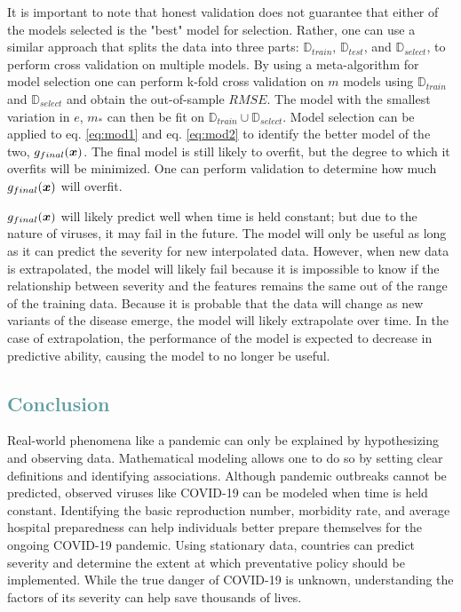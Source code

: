 \documentclass[12pt]{article}
\begin{document}
It is important to note that honest validation does not guarantee that either of the models selected is the "best" model for selection. Rather, one can use a similar approach that splits the data into three parts: $\mathbb{D}_{train}$, $\mathbb{D}_{test}$, and $\mathbb{D}_{select}$, to perform cross validation on multiple models. By using a meta-algorithm for model selection one can perform k-fold cross validation on $m$ models using $\mathbb{D}_{train}$ and $\mathbb{D}_{select}$ and obtain the out-of-sample $RMSE$. The model with the smallest variation in $e$, $m_*$ can then be fit on $\mathbb{D}_{train} \cup \mathbb{D}_{select}$. Model selection can be applied to eq. \ref{eq:mod1} and eq. \ref{eq:mod2} to identify the better model of the two, $g_{final}(\boldsymbol{x})$. The final model is still likely to overfit, but the degree to which it overfits will be minimized. One can perform validation to determine how much $g_{final}(\boldsymbol{x})$ will overfit.

$g_{final}(\boldsymbol{x})$ will likely predict well when time is held constant; but due to the nature of viruses, it may fail in the future. The model will only be useful as long as it can predict the severity for new interpolated data. However, when new data is extrapolated, the model will likely fail because it is impossible to know if the relationship between severity and the features remains the same out of the range of the training data. Because it is probable that the data will change as new variants of the disease emerge, the model will likely extrapolate over time. In the case of extrapolation, the performance of the model is expected to decrease in predictive ability, causing the model to no longer be useful. 





\textcolor{CadetBlue}{\section{Conclusion}}

Real-world phenomena like a pandemic can only be explained by hypothesizing and observing data. Mathematical modeling allows one to do so by setting clear definitions and identifying associations. Although pandemic outbreaks cannot be predicted, observed viruses like COVID-19 can be modeled when time is held constant. Identifying the basic reproduction number, morbidity rate, and average hospital preparedness can help individuals better prepare themselves for the ongoing COVID-19 pandemic. Using stationary data, countries can predict severity and determine the extent at which preventative policy should be implemented. While the true danger of COVID-19 is unknown, understanding the factors of its severity can help save thousands of lives.

\pagebreak


\singlespacing

\end{document}

